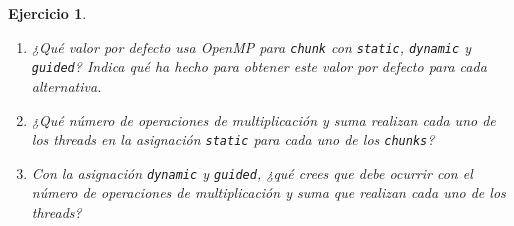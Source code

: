 \documentclass[11pt]{article}
\theoremstyle{definition-style}
\newtheorem{ejer}{Ejercicio}
\begin{document}
\begin{ejer}
    \begin{enumerate}[label=\alph*)]
        \item ¿Qué valor por defecto usa OpenMP para \texttt{chunk} con \texttt{static}, \texttt{dynamic} y \texttt{guided}? Indica qué ha hecho para obtener este valor por defecto para cada alternativa.
        \item ¿Qué número de operaciones de multiplicación y suma realizan cada uno de los threads en la asignación \texttt{static} para cada uno de los \texttt{chunks}?
        \item Con la asignación \texttt{dynamic} y \texttt{guided}, ¿qué crees que debe ocurrir con el número de operaciones de multiplicación y suma que realizan cada uno de los threads?
    \end{enumerate}
\end{ejer}


    
\end{document}
